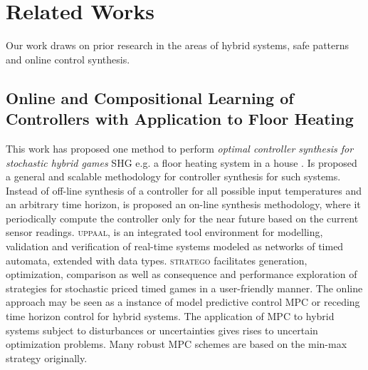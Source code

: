 
\chapter{Related Works}
\label{ch:relatedWorks}

Our work draws on prior research in the areas of hybrid systems, safe patterns
and online control synthesis.

\section{Online and Compositional Learning of Controllers with Application to Floor Heating}
    \label{sec:onlinefloorheating}
    This work has proposed one method to perform \textit{optimal controller 
    synthesis for stochastic hybrid games} \ac{SHG} e.g. a  floor heating 
     system in a house \cite{larsen2016online}. 
    Is proposed a general and scalable methodology for controller synthesis 
    for such systems. Instead of off-line synthesis of a controller for 
    all possible input temperatures and an arbitrary time horizon, is 
    proposed an on-line synthesis methodology, where  it periodically 
    compute the controller only for the near future based on the 
    current sensor readings. \textsc{uppaal}, is an integrated tool environment 
    for modelling, validation and verification of real-time systems modeled as 
    networks of  timed automata, extended with data types. \textsc{stratego} 
    facilitates generation, optimization, comparison as well as consequence and
    performance exploration of strategies for stochastic priced timed games
    in a user-friendly manner. The online approach may be seen as a instance 
    of model predictive control \ac{MPC} or receding time horizon control for hybrid 
    systems. The application of \ac{MPC} to hybrid systems subject to disturbances or 
    uncertainties gives rises to uncertain optimization problems. Many robust 
    \ac{MPC} schemes are based on the min-max strategy originally.

